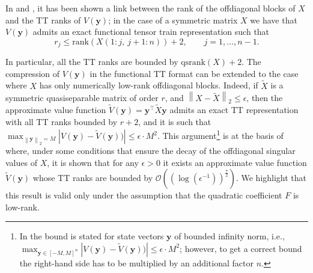 \documentclass[a4paper,10pt]{article}
\def\rank{\mathrm{rank}}
\def\qsrank{\mathrm{qsrank}}
\newcommand{\norm}[1]{\left\lVert#1\right\rVert}
\begin{document}
In \cite[Theorem 4.2]{dolgov13} and \cite[Lemma 3.5]{kazeev13}, it has been shown a link between the rank of the offdiagonal blocks of $X$ and the TT ranks of $V(\mathbf y)$; in the case of a symmetric matrix $X$ we have that $V(\mathbf y)$ admits an exact functional tensor train representation such that
\begin{equation*}\label{eq:ttrank}
r_j\leq \rank\left( X(1:j,\ j+1:n)\right) +2,\qquad j=1,\dots,n-1.	
\end{equation*}


In particular, all the TT ranks are bounded by $\qsrank(X)+2$. The compression of $V(\mathbf y)$ in the functional TT format can be extended to the case where $X$ has only numerically low-rank offdiagonal blocks. Indeed, if $\widetilde X$ is a symmetric  quasiseparable matrix of order $r$, and $\norm{X-\widetilde X}_2\le \epsilon$, then the approximate value function $\widetilde V(\mathbf y)=\mathbf y^\top\widetilde X\mathbf y$ admits an exact TT representation with all TT ranks bounded by $r+2$, and it is such that $\max_{\norm{\mathbf y}_2=M}|V(\mathbf y)-\widetilde V(\mathbf y))|\le \epsilon\cdot  M^2$. This argument\footnote{In \cite{dolgov21} the bound is stated for state vectors $\mathbf y$ of bounded infinity norm, i.e., $\max_{\mathbf y\in[-M,M]^n}|V(\mathbf y)-\widetilde V(\mathbf y))|\le \epsilon\cdot  M^2$; however, to get a correct bound  the right-hand side has to be multiplied by an additional factor $n$.} is at the basis of \cite[Theorem 3.1]{dolgov21} where, under some conditions that ensure the decay of the offdiagonal singular values of $X$, it is shown that for any $\epsilon>0$ it exists an approximate value function $\widetilde V(\mathbf y)$ whose TT ranks are bounded by $\mathcal O((\log(\epsilon^{-1}))^{\frac 72})$. We highlight that this result is valid only under the assumption that the quadratic coefficient $F$ is low-rank. 
\end{document}
